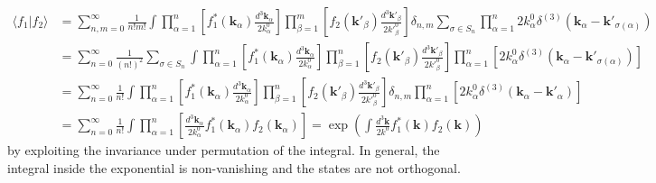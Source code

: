 \begin{equation}
\begin{aligned}
    \langle f_1 | f_2 \rangle &= \sum_{n,m=0}^\infty \frac{1}{n!m!} \int \prod_{\alpha=1}^n \left[ f_1^*(\mathbf{k}_\alpha) \frac{d^3\mathbf{k}_\alpha}{2k^0_\alpha} \right] \prod_{\beta=1}^m \left[ f_2(\mathbf{k}'_\beta) \frac{d^3\mathbf{k}'_\beta}{2k'^0_\beta} \right] \delta_{n,m} \sum_{\sigma \in S_n} \prod_{\alpha=1}^n 2k^0_\alpha \delta^{(3)}(\mathbf{k}_\alpha - \mathbf{k}'_{\sigma(\alpha)}) \\
    &= \sum_{n=0}^\infty \frac{1}{(n!)^2} \sum_{\sigma \in S_n} \int \prod_{\alpha=1}^n \left[ f_1^*(\mathbf{k}_\alpha) \frac{d^3\mathbf{k}_\alpha}{2k^0_\alpha} \right] \prod_{\beta=1}^n \left[ f_2(\mathbf{k}'_\beta) \frac{d^3\mathbf{k}'_\beta}{2k'^0_\beta} \right] \prod_{\alpha=1}^n \left[ 2k^0_\alpha \delta^{(3)}(\mathbf{k}_\alpha - \mathbf{k}'_{\sigma(\alpha)}) \right] \\
    &= \sum_{n=0}^\infty \frac{1}{n!} \int \prod_{\alpha=1}^n \left[ f_1^*(\mathbf{k}_\alpha) \frac{d^3\mathbf{k}_\alpha}{2k^0_\alpha} \right] \prod_{\beta=1}^n \left[ f_2(\mathbf{k}'_\beta) \frac{d^3\mathbf{k}'_\beta}{2k'^0_\beta} \right] \delta_{n,m} \prod_{\alpha=1}^n \left[ 2k^0_\alpha \delta^{(3)}(\mathbf{k}_\alpha - \mathbf{k}'_\alpha) \right] \\
    &= \sum_{n=0}^\infty \frac{1}{n!} \int \prod_{\alpha=1}^n \left[ \frac{d^3\mathbf{k}_\alpha}{2k^0_\alpha} f_1^*(\mathbf{k}_\alpha) f_2(\mathbf{k}_\alpha) \right] = \exp \left( \int \frac{d^3\mathbf{k}}{2k^0} f_1^*(\mathbf{k}) f_2(\mathbf{k}) \right)
\end{aligned}
\end{equation}
by exploiting the invariance under permutation of the integral. In general, the integral inside the exponential is non-vanishing and the states are not orthogonal.

